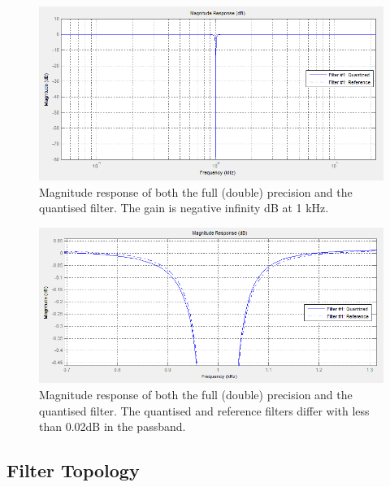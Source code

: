\documentclass[]{article}
\begin{document}
\begin{figure}[htbp]
	\begin{center}
		\includegraphics[width = \textwidth]{matlabmagnitudelog.PNG}
	\end{center}
	\caption{Magnitude response of both the full (double) precision and the quantised filter. The gain is negative infinity dB at 1 kHz.}
	\label{fig:matlabmagnitudelog}
\end{figure}

\begin{figure}[htbp]
	\begin{center}
		\includegraphics[width = \textwidth]{matlabmagnitude2.PNG}
	\end{center}
	\caption{Magnitude response of both the full (double) precision and the quantised filter. The quantised and reference filters differ with less than 0.02dB in the passband.}
	\label{fig:matlabmagnitudezoom}
\end{figure}


\subsection{Filter Topology} %
\label{sub:filter_topology}
\end{document}
